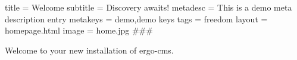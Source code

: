title = Welcome
subtitle = Discovery awaits!
metadesc = This is a demo meta description entry
metakeys = demo,demo keys
tags = freedom
layout = homepage.html
image = home.jpg
###

Welcome to your new installation of ergo-cms.


